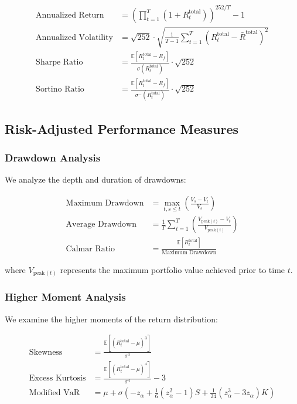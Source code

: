 \begin{equation}
\begin{aligned}
    \text{Annualized Return} &= \left(\prod_{t=1}^T (1 + R_t^{\text{total}})\right)^{252/T} - 1 \\
    \text{Annualized Volatility} &= \sqrt{252} \cdot \sqrt{\frac{1}{T-1}\sum_{t=1}^T (R_t^{\text{total}} - \bar{R}^{\text{total}})^2} \\
    \text{Sharpe Ratio} &= \frac{\mathbb{E}[R_t^{\text{total}} - R_f]}{\sigma(R_t^{\text{total}})} \cdot \sqrt{252} \\
    \text{Sortino Ratio} &= \frac{\mathbb{E}[R_t^{\text{total}} - R_f]}{\sigma^-(R_t^{\text{total}})} \cdot \sqrt{252}
\end{aligned}
\end{equation}

\subsection{Risk-Adjusted Performance Measures}

\subsubsection{Drawdown Analysis}
We analyze the depth and duration of drawdowns:

\begin{equation}
\begin{aligned}
    \text{Maximum Drawdown} &= \max_{t,s\leq t}\left(\frac{V_s - V_t}{V_s}\right) \\
    \text{Average Drawdown} &= \frac{1}{T}\sum_{t=1}^T \left(\frac{V_{\text{peak}(t)} - V_t}{V_{\text{peak}(t)}}\right) \\
    \text{Calmar Ratio} &= \frac{\mathbb{E}[R_t^{\text{total}}]}{\text{Maximum Drawdown}}
\end{aligned}
\end{equation}

where $V_{\text{peak}(t)}$ represents the maximum portfolio value achieved prior to time $t$.

\subsubsection{Higher Moment Analysis}
We examine the higher moments of the return distribution:

\begin{equation}
\begin{aligned}
    \text{Skewness} &= \frac{\mathbb{E}[(R_t^{\text{total}} - \mu)^3]}{\sigma^3} \\
    \text{Excess Kurtosis} &= \frac{\mathbb{E}[(R_t^{\text{total}} - \mu)^4]}{\sigma^4} - 3 \\
    \text{Modified VaR} &= \mu + \sigma\left(-z_\alpha + \frac{1}{6}(z_\alpha^2-1)S + \frac{1}{24}(z_\alpha^3-3z_\alpha)K\right)
\end{aligned}
\end{equation}


